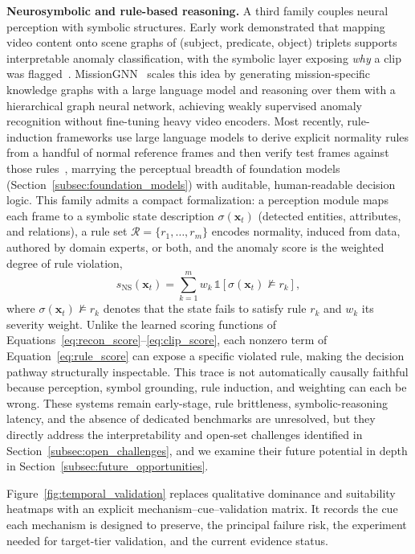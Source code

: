 \documentclass[10pt,a4paper]{article}
\begin{document}
\textbf{Neurosymbolic and rule-based reasoning.} A third family couples neural perception with symbolic structures. Early work demonstrated that mapping video content onto scene graphs of (subject, predicate, object) triplets supports interpretable anomaly classification, with the symbolic layer exposing \emph{why} a clip was flagged~\citep{chen2018scenegraphs}. MissionGNN~\citep{yun2025missiongnn} scales this idea by generating mission-specific knowledge graphs with a large language model and reasoning over them with a hierarchical graph neural network, achieving weakly supervised anomaly recognition without fine-tuning heavy video encoders. Most recently, rule-induction frameworks use large language models to derive explicit normality rules from a handful of normal reference frames and then verify test frames against those rules~\citep{yang2024follow}, marrying the perceptual breadth of foundation models (Section~\ref{subsec:foundation_models}) with auditable, human-readable decision logic. This family admits a compact formalization: a perception module maps each frame to a symbolic state description $\sigma(\mathbf{x}_t)$ (detected entities, attributes, and relations), a rule set $\mathcal{R} = \{r_1, \ldots, r_m\}$ encodes normality, induced from data, authored by domain experts, or both, and the anomaly score is the weighted degree of rule violation,
\begin{equation}
    s_{\text{NS}}(\mathbf{x}_t) = \sum_{k=1}^{m} w_k \, \mathbb{1}\!\left[ \sigma(\mathbf{x}_t) \nvDash r_k \right], \label{eq:rule_score}
\end{equation}
where $\sigma(\mathbf{x}_t) \nvDash r_k$ denotes that the state fails to satisfy rule $r_k$ and $w_k$ its severity weight. Unlike the learned scoring functions of Equations~\ref{eq:recon_score}--\ref{eq:clip_score}, each nonzero term of Equation~\ref{eq:rule_score} can expose a specific violated rule, making the decision pathway structurally inspectable. This trace is not automatically causally faithful because perception, symbol grounding, rule induction, and weighting can each be wrong. These systems remain early-stage, rule brittleness, symbolic-reasoning latency, and the absence of dedicated benchmarks are unresolved, but they directly address the interpretability and open-set challenges identified in Section~\ref{subsec:open_challenges}, and we examine their future potential in depth in Section~\ref{subsec:future_opportunities}.

Figure~\ref{fig:temporal_validation} replaces qualitative dominance and suitability heatmaps with an explicit mechanism--cue--validation matrix. It records the cue each mechanism is designed to preserve, the principal failure risk, the experiment needed for target-tier validation, and the current evidence status.
\end{document}
